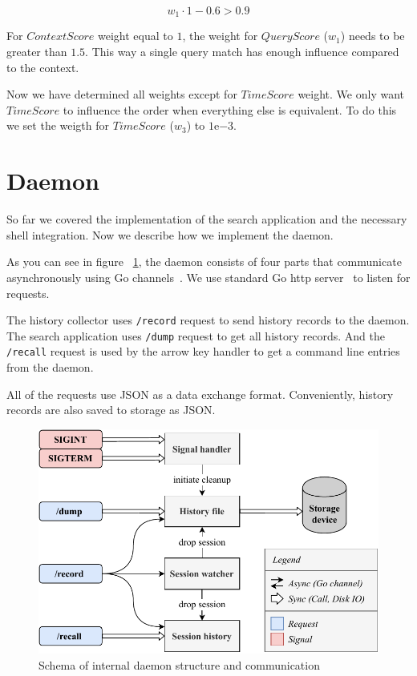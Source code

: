 \documentclass[thesis=M,english]{FITthesis}[2012/10/20]
\newcommand{\tmpframe}[1]{\fbox{#1}}
\renewcommand{\tmpframe}[1]{#1}
\let\myCite\cite
\renewcommand\cite{\unskip~\myCite}
\let\myRef\ref
\renewcommand\ref{\unskip~\myRef}
\begin{document}
\[  w_1 \cdot 1 - 0.6 > 0.9 \]

For \(ContextScore\) weight equal to \(1\), the weight for \(QueryScore\) (\(w_1\)) needs to be greater than \(1.5\). This way a single query match has enough influence compared to the context.

Now we have determined all weights except for \(TimeScore\) weight. We only want \(TimeScore\) to influence the order when everything else is equivalent. To do this we set the weigth for \(TimeScore\) (\(w_3\)) to $1\mathrm{e}{-3}$.


\section{Daemon}

So far we covered the implementation of the search application and the necessary shell integration. Now we describe how we implement the daemon.


As you can see in figure \ref{impl-daemon-channels}, the daemon consists of four parts that communicate asynchronously using Go channels\cite{lib-go-channels}. We use standard Go http server\cite{lib-go-http} to listen for requests. 

The history collector uses \verb|/record| request to send history records to the daemon. The search application uses \verb|/dump| request to get all history records. And the \verb|/recall| request is used by the arrow key handler to get a command line entries from the daemon. 

All of the requests use JSON as a data exchange format. Conveniently, history records are also saved to storage as JSON.

\begin{figure}
\centering
  \tmpframe{\includegraphics[width=\linewidth]{figures/implementation/thesis-impl-daemon-channels.pdf}}
  \caption{Schema of internal daemon structure and communication}
  \label{impl-daemon-channels}
\end{figure}
\end{document}
